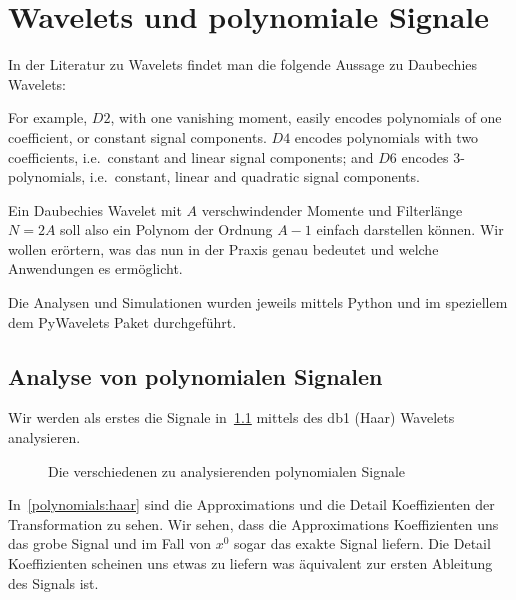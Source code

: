 %
%
%
\chapter{Wavelets und polynomiale Signale\label{chapter:thema}}
\begin{refsection}

In der Literatur zu Wavelets findet man die folgende Aussage zu Daubechies
Wavelets:
\begin{displayquote}
For example, $D2$, with one vanishing moment, easily encodes polynomials of one
coefficient, or constant signal components. $D4$ encodes polynomials with two
coefficients, i.e.\ constant and linear signal components; and $D6$ encodes
3-polynomials, i.e.\ constant, linear and quadratic signal components.
\end{displayquote}
Ein Daubechies Wavelet mit $A$ verschwindender Momente und Filterlänge $N=2A$
soll also ein Polynom der Ordnung $A-1$ einfach darstellen können. Wir wollen
erörtern, was das nun in der Praxis genau bedeutet und welche Anwendungen es
ermöglicht.

Die Analysen und Simulationen wurden jeweils mittels Python\cite{python} und im
speziellem dem PyWavelets\cite{gregory_r_lee_2019_2634243} Paket durchgeführt.

\section{Analyse von polynomialen Signalen}

Wir werden als erstes die Signale in~\ref{polynomials:signals} mittels des db1
(Haar) Wavelets analysieren.

\begin{figure}
    \centering
    
    \caption{Die verschiedenen zu analysierenden polynomialen Signale\label{polynomials:signals}}
\end{figure}

In~\ref{polynomials:haar} sind die Approximations und die Detail Koeffizienten
der Transformation zu sehen. Wir sehen, dass die Approximations Koeffizienten
uns das grobe Signal und im Fall von $x^0$ sogar das exakte Signal liefern. Die
Detail Koeffizienten scheinen uns etwas zu liefern was äquivalent zur ersten
Ableitung des Signals ist.


\end{refsection}
